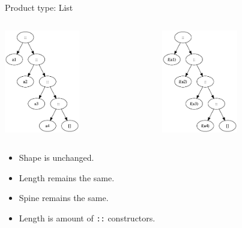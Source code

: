 \documentclass[presentation,aspectratio=169,smaller]{beamer}
\begin{document}
\begin{frame}[label={sec:org2f9a0b5},fragile]{Product type: List}
 \begin{columns}
\begin{column}[t]{0.5\columnwidth}
\begin{center}
\includegraphics[height=4.5cm]{.dot/functor-list-1.png}
\end{center}
\end{column}

\begin{column}[t]{0.5\columnwidth}
\begin{center}
\includegraphics[height=4.5cm]{.dot/functor-list-2.png}
\end{center}
\end{column}
\end{columns}

\begin{itemize}
\item Shape is unchanged.
\item Length remains the same.
\item Spine remains the same.
\item Length is amount of \texttt{::} constructors.
\end{itemize}
\end{frame}
\end{document}
